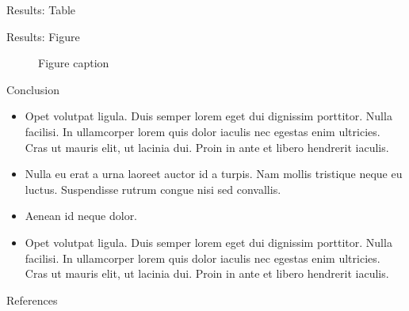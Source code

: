 \documentclass[final,hyperref={pdfpagelabels=false}]{beamer}
\begin{document}
\begin{frame}[t]
\begin{columns}[t]
\begin{column}{.32\textwidth}
\begin{block}{Results: Table}
  \end{block}


  \begin{block}{Results: Figure}

    \begin{figure}
      \caption{Figure caption}
    \end{figure}

  \end{block}


  \begin{block}{Conclusion}

    \begin{itemize}
    \item Opet volutpat ligula. Duis semper lorem eget dui dignissim
      porttitor. Nulla facilisi. In ullamcorper lorem quis dolor
      iaculis nec egestas enim ultricies. Cras ut mauris elit, ut
      lacinia dui. Proin in ante et libero hendrerit iaculis.
    \item Nulla eu erat a urna laoreet auctor id a turpis. Nam mollis
      tristique neque eu luctus. Suspendisse rutrum congue nisi sed
      convallis.
    \item Aenean id neque dolor.
    \item Opet volutpat ligula. Duis semper lorem eget dui dignissim
      porttitor. Nulla facilisi. In ullamcorper lorem quis dolor
      iaculis nec egestas enim ultricies. Cras ut mauris elit, ut
      lacinia dui. Proin in ante et libero hendrerit iaculis.
    \end{itemize}

  \end{block}


  \begin{block}{References}
        
    \nocite{*} %
    \small{ }


\end{block}
\end{column}
\end{columns}
\end{frame}
\end{document}
